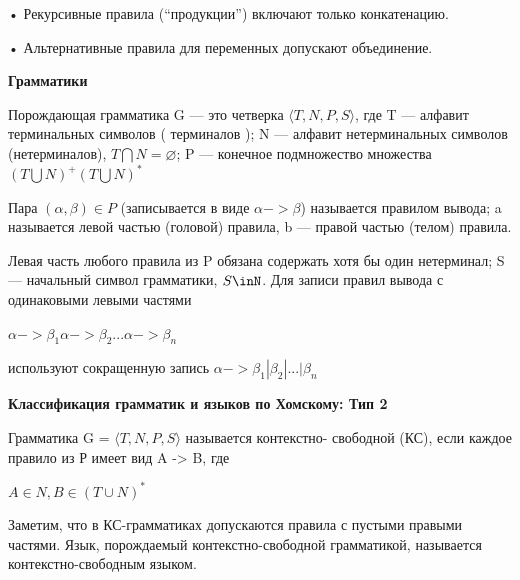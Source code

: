 \documentclass{article}
\begin{document}
• Рекурсивные правила (“продукции”) включают только конкатенацию.

• Альтернативные правила для переменных допускают объединение.



\textbf{Грамматики}


Порождающая грамматика G — это четверка $\langle T, N, P, S  \rangle $,
где T — алфавит терминальных символов ( терминалов );
N — алфавит нетерминальных символов (нетерминалов), $T \bigcap N =\varnothing$;
P — конечное подмножество множества $(T \bigcup N)^+ (T \bigcup N)^*$

Пара $(\alpha, \beta)\in P$ (записывается в виде $\alpha -> \beta$) называется правилом вывода;
a называется левой частью (головой) правила, b — правой частью (телом)
правила.

Левая часть любого правила из P обязана содержать хотя бы один
нетерминал;
S — начальный символ грамматики, $S \inN$.
Для записи правил вывода с одинаковыми левыми частями

$\alpha -> \beta_1 \alpha -> \beta_2 ... \alpha -> \beta_n$

используют сокращенную запись $\alpha -> \beta_1 | \beta_2 |...| \beta_n$

\textbf{Классификация грамматик и языков по Хомскому: Тип 2}

Грамматика G = $ \langle T, N, P, S \rangle $ называется контекстно-
свободной (КС), если каждое правило из Р имеет вид A -> B, где

$A \in N, B \in ( T \cup N )^*$

Заметим, что в КС-грамматиках допускаются правила с пустыми
правыми частями. Язык, порождаемый контекстно-свободной
грамматикой, называется контекстно-свободным языком.
\end{document}
